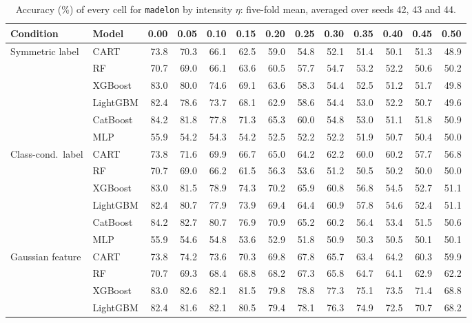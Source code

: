 \begin{table}[p]
\centering
\tiny
\setlength{\tabcolsep}{2.6pt}
\caption{Accuracy (\%) of every cell for \texttt{madelon} by intensity $\eta$: five-fold mean, averaged over seeds 42, 43 and 44.}
\label{tab:grid_madelon}
\begin{tabular}{@{}llrrrrrrrrrrr@{}}
\toprule
Condition & Model & 0.00 & 0.05 & 0.10 & 0.15 & 0.20 & 0.25 & 0.30 & 0.35 & 0.40 & 0.45 & 0.50 \\
\midrule
Symmetric label & CART & 73.8 & 70.3 & 66.1 & 62.5 & 59.0 & 54.8 & 52.1 & 51.4 & 50.1 & 51.3 & 48.9 \\
 & RF & 70.7 & 69.0 & 66.1 & 63.6 & 60.5 & 57.7 & 54.7 & 53.2 & 52.2 & 50.6 & 50.2 \\
 & XGBoost & 83.0 & 80.0 & 74.6 & 69.1 & 63.6 & 58.3 & 54.4 & 52.5 & 51.2 & 51.7 & 49.8 \\
 & LightGBM & 82.4 & 78.6 & 73.7 & 68.1 & 62.9 & 58.6 & 54.4 & 53.0 & 52.2 & 50.7 & 49.6 \\
 & CatBoost & 84.2 & 81.8 & 77.8 & 71.3 & 65.3 & 60.0 & 54.8 & 53.0 & 51.1 & 51.8 & 50.9 \\
 & MLP & 55.9 & 54.2 & 54.3 & 54.2 & 52.5 & 52.2 & 52.2 & 51.9 & 50.7 & 50.4 & 50.0 \\
\midrule
Class-cond.\ label & CART & 73.8 & 71.6 & 69.9 & 66.7 & 65.0 & 64.2 & 62.2 & 60.0 & 60.2 & 57.7 & 56.8 \\
 & RF & 70.7 & 69.0 & 66.2 & 61.5 & 56.3 & 53.6 & 51.2 & 50.5 & 50.2 & 50.0 & 50.0 \\
 & XGBoost & 83.0 & 81.5 & 78.9 & 74.3 & 70.2 & 65.9 & 60.8 & 56.8 & 54.5 & 52.7 & 51.1 \\
 & LightGBM & 82.4 & 80.7 & 77.9 & 73.9 & 69.4 & 64.4 & 60.9 & 57.8 & 54.6 & 52.4 & 51.1 \\
 & CatBoost & 84.2 & 82.7 & 80.7 & 76.9 & 70.9 & 65.2 & 60.2 & 56.4 & 53.4 & 51.5 & 50.6 \\
 & MLP & 55.9 & 54.6 & 54.8 & 53.6 & 52.9 & 51.8 & 50.9 & 50.3 & 50.5 & 50.1 & 50.1 \\
\midrule
Gaussian feature & CART & 73.8 & 74.2 & 73.6 & 70.3 & 69.8 & 67.8 & 65.7 & 63.4 & 64.2 & 60.3 & 59.9 \\
 & RF & 70.7 & 69.3 & 68.4 & 68.8 & 68.2 & 67.3 & 65.8 & 64.7 & 64.1 & 62.9 & 62.2 \\
 & XGBoost & 83.0 & 82.6 & 82.1 & 81.5 & 79.8 & 78.8 & 77.3 & 75.1 & 73.5 & 71.4 & 68.8 \\
 & LightGBM & 82.4 & 81.6 & 82.1 & 80.5 & 79.4 & 78.1 & 76.3 & 74.9 & 72.5 & 70.7 & 68.2 \\

\end{tabular}
\end{table}
